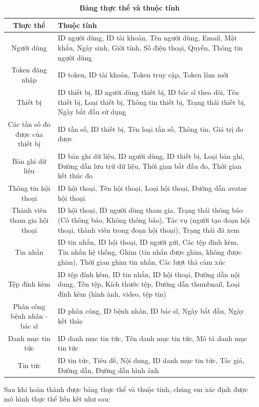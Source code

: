 \begin{table}[H]
  \caption{\bfseries \fontsize{12pt}{0pt}\selectfont Bảng thực thể và thuộc tính}
  \centering
  \begin{tabularx}{0.9\textwidth}{|c|X|}
    \hline
    \textbf{Thực thể} & \textbf{Thuộc tính} \\
    \hline
    Người dùng & 
    ID người dùng, ID tài khoản, Tên người dùng, Email, Mật khẩu, Ngày sinh, Giới tính, Số điện thoại, Quyền, Thông tin người dùng \\
    \hline
    Token đăng nhập &
    ID token, ID tài khoản, Token truy cập, Token làm mới \\
    \hline
    Thiết bị & 
    ID thiết bị, ID người dùng thiết bị, ID bác sĩ theo dõi, Tên thiết bị, Loại thiết bị, Thông tin thiết bị, Trạng thái thiết bị, Ngày bắt đầu sử dụng\\
    \hline
    Các tần số đo được của thiết bị &
    ID tần số, ID thiết bị, Tên loại tần số, Thông tin, Giá trị đo được \\
    \hline
    Bản ghi dữ liệu & 
    ID bản ghi dữ liệu, ID người dùng, ID thiết bị, Loại bản ghi, Đường dẫn lưu trữ dữ liệu, Thời gian bắt đầu đo, Thời gian kết thúc đo \\
    \hline
    Thông tin hội thoại &
    ID hội thoại, Tên hội thoại, Loại hội thoại, Đường dẫn avatar hội thoại \\
    \hline
    Thành viên tham gia hội thoại &
    ID hội thoại, ID người dùng tham gia, Trạng thái thông báo (Có thông báo, Không thông báo), Tác vụ (người tạo đoạn hội thoại, thành viên trong đoạn hội thoại), Trạng thái đã xem\\
    \hline
    Tin nhắn & 
    ID tin nhắn, ID hội thoại, ID người gửi, Các tệp đính kèm, Tin nhắn hệ thống, Ghim (tin nhắn được ghim, không được ghim), Thời gian ghim tin nhắn, Các lượt thả cảm xúc \\
    \hline
    Tệp đính kèm &
    ID tệp đính kèm, ID tin nhắn, ID hội thoại, Đường dẫn nội dung, Tên tệp, Kích thước tệp, Đường dẫn thumbnail, Loại đính kèm (hình ảnh, video, tệp tin) \\
    \hline 
    Phân công bệnh nhân - bác sĩ & 
    ID phân công, ID bệnh nhân, ID bác sĩ, Ngày bắt đầu, Ngày kết thúc \\
    \hline
    Danh mục tin tức &
    ID danh mục tin tức, Tên danh mục tin tức, Mô tả danh mục tin tức \\
    \hline
    Tin tức &
    ID tin tức, Tiêu đề, Nội dung, ID danh mục tin tức, Tác giả, Đường dẫn, Đường dẫn hình ảnh \\
    \hline
  \end{tabularx}

  
\end{table}
Sau khi hoàn thành được bảng thực thể và thuộc tính, chúng em xác định được mô hình thực thể liên kết như sau:

